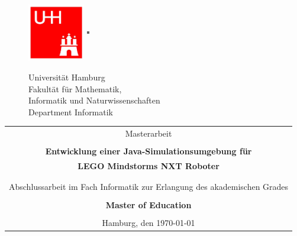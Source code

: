 \begin{titlepage}
\enlargethispage{\baselineskip}
\begin{figure}[htbp]
		\begin{minipage}[b]{25mm}
			\includegraphics[width=25mm,clip]{images/logo_uhh}
		\end{minipage}
		\begin{minipage}[b]{2mm}
			\includegraphics[width=1mm,height=25mm]{images/greypixel}
		\end{minipage}
		\begin{minipage}[b]{10cm}
			{   
				\vspace{2mm}
				{\Large Universität Hamburg } \\
				Fakultät für Mathematik,\\
				Informatik und Naturwissenschaften \\
				Department Informatik \\
			}
		\end{minipage}
	\end{figure}

\vspace{0.5cm} 
\begin{tabular}{c}
 \huge	Masterarbeit\\
 \\
\large\textbf{ Entwicklung einer Java-Simulationsumgebung für} \\
\large\textbf{LEGO Mindstorms NXT Roboter}\\		  
\\
\\
\small Abschlussarbeit im Fach Informatik zur Erlangung des akademischen Grades\\
\\
\normalsize \textbf{Master of Education}\\
\\
\normalsize Hamburg, den \today

\end{tabular}


\end{titlepage}
